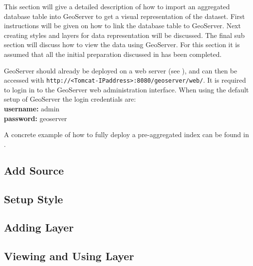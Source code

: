 This section will give a detailed description of how to import an aggregated database table into GeoServer to get a visual representation of the dataset. First instructions will be given on how to link the database table to GeoServer. Next creating styles and layers for data representation will be discussed. The final sub section will discuss how to view the data using GeoServer.  For this section it is assumed that all the initial preparation discussed in  has been completed.

GeoServer should already be deployed on a web server (see ), and can then be accessed with \lstinline|http://<Tomcat-IPaddress>:8080/geoserver/web/|. It is required to login in to the GeoServer web administration interface. When using the default setup of GeoServer the login credentials are: \\
\indent \textbf{username:} admin \\
\indent \textbf{password:} geoserver

\noindent A concrete example of how to fully deploy a pre-aggregated index can be found in .

\subsection{Add Source}
\label{sec:addingsource}

\pagebreak

\subsection{Setup Style}
\label{sec:addingstyle}


\subsection{Adding Layer}
\label{sec:addinglayers}


\subsection{Viewing and Using Layer}
\label{sec:previewlayer}

